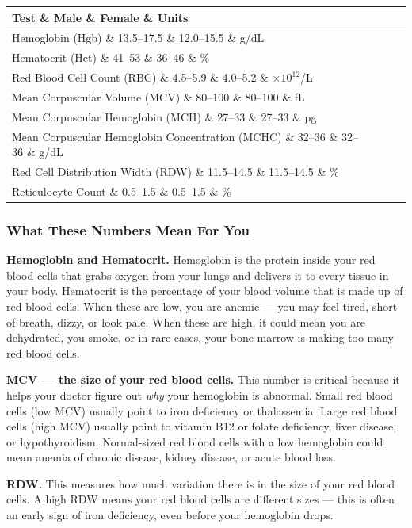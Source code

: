 \begin{longtable}{@{}llll@{}}
\toprule
\textbf{Test} \& \textbf{Male} \& \textbf{Female} \& \textbf{Units} \\
\midrule
\endhead
Hemoglobin (Hgb) \& 13.5--17.5 \& 12.0--15.5 \& g/dL \\
Hematocrit (Hct) \& 41--53 \& 36--46 \& \% \\
Red Blood Cell Count (RBC) \& 4.5--5.9 \& 4.0--5.2 \& $\times 10^{12}$/L \\
Mean Corpuscular Volume (MCV) \& 80--100 \& 80--100 \& fL \\
Mean Corpuscular Hemoglobin (MCH) \& 27--33 \& 27--33 \& pg \\
Mean Corpuscular Hemoglobin Concentration (MCHC) \& 32--36 \& 32--36 \& g/dL \\
Red Cell Distribution Width (RDW) \& 11.5--14.5 \& 11.5--14.5 \& \% \\
Reticulocyte Count \& 0.5--1.5 \& 0.5--1.5 \& \% \\
\bottomrule
\end{longtable}

\subsubsection{What These Numbers Mean For You}

\textbf{Hemoglobin and Hematocrit.} Hemoglobin is the protein inside your red blood cells that grabs oxygen from your lungs and delivers it to every tissue in your body. Hematocrit is the percentage of your blood volume that is made up of red blood cells. When these are low, you are anemic --- you may feel tired, short of breath, dizzy, or look pale. When these are high, it could mean you are dehydrated, you smoke, or in rare cases, your bone marrow is making too many red blood cells.

\textbf{MCV --- the size of your red blood cells.} This number is critical because it helps your doctor figure out \emph{why} your hemoglobin is abnormal. Small red blood cells (low MCV) usually point to iron deficiency or thalassemia. Large red blood cells (high MCV) usually point to vitamin B12 or folate deficiency, liver disease, or hypothyroidism. Normal-sized red blood cells with a low hemoglobin could mean anemia of chronic disease, kidney disease, or acute blood loss.

\textbf{RDW.} This measures how much variation there is in the size of your red blood cells. A high RDW means your red blood cells are different sizes --- this is often an early sign of iron deficiency, even before your hemoglobin drops.

